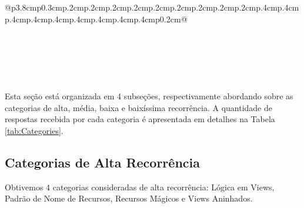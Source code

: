 \begin{table*}[t]
\begin{tabular}{@{}p{3.8cm}p{0.3cm}p{.2cm}p{.2cm}p{.2cm}p{.2cm}p{.2cm}p{.2cm}p{.2cm}p{.2cm}p{.2cm}p{.4cm}p{.4cm}p{.4cm}p{.4cm}p{.4cm}p{.4cm}p{.4cm}p{.4cm}p{.4cm}p{0.2cm}@{}}
 \\
 \\
 \\
 \\
 \\
 \\
\toprule
\end{tabular}
\caption{Lista de categorias de alta, m\'edia e baixa recorr\^encia.}
\label{tab:Categories}
\end{table*}


Esta se\c{c}\~ao est\'a organizada em 4 subse\c{c}\~oes, respectivamente abordando sobre as categorias de alta, m\'edia, baixa e baix\'issima recorr\^encia. A quantidade de respostas recebida por cada categoria \'e apresentada em detalhes na Tabela \ref{tab:Categories}.

\subsection{Categorias de Alta Recorr\^encia}
Obtivemos 4 categorias consideradas de alta recorr\^encia: L\'ogica em Views, Padr\~ao de Nome de Recursos, Recursos M\'agicos e Views Aninhados.


